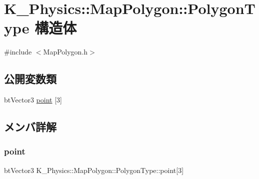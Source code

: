 \hypertarget{struct_k___physics_1_1_map_polygon_1_1_polygon_type}{}\section{K\+\_\+\+Physics\+:\+:Map\+Polygon\+:\+:Polygon\+Type 構造体}
\label{struct_k___physics_1_1_map_polygon_1_1_polygon_type}


{\ttfamily \#include $<$Map\+Polygon.\+h$>$}

\subsection*{公開変数類}
\begin{DoxyCompactItemize}
\item 
bt\+Vector3 \mbox{\hyperlink{struct_k___physics_1_1_map_polygon_1_1_polygon_type_a3288e14bc56fcea91db8359645fa496b}{point}} \mbox{[}3\mbox{]}
\end{DoxyCompactItemize}


\subsection{メンバ詳解}
\mbox{\label{struct_k___physics_1_1_map_polygon_1_1_polygon_type_a3288e14bc56fcea91db8359645fa496b}} 
\subsubsection{\texorpdfstring{point}{point}}
{\footnotesize\ttfamily bt\+Vector3 K\+\_\+\+Physics\+::\+Map\+Polygon\+::\+Polygon\+Type\+::point\mbox{[}3\mbox{]}}

